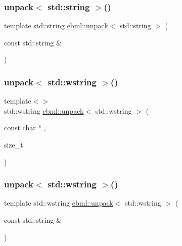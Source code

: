 \mbox{\label{namespaceebml_a59216a04daa34cd404bdd97600ab1fe1}} 
\subsubsection{\texorpdfstring{unpack$<$ std\+::string $>$()}{unpack< std::string >()}\hspace{0.1cm}{\footnotesize\ttfamily [2/2]}}
{\footnotesize\ttfamily template std\+::string \mbox{\hyperlink{namespaceebml_a55a0f9d0c93e80d488021fd03c4f3861}{ebml\+::unpack}}$<$ std\+::string $>$ (\begin{DoxyParamCaption}\item[{const std\+::string \&}]{ }\end{DoxyParamCaption})}

\mbox{\label{namespaceebml_afe61c84674c5ceeaf4d19fa2f994e37b}} 
\subsubsection{\texorpdfstring{unpack$<$ std\+::wstring $>$()}{unpack< std::wstring >()}\hspace{0.1cm}{\footnotesize\ttfamily [1/2]}}
{\footnotesize\ttfamily template$<$$>$ \\
std\+::wstring \mbox{\hyperlink{namespaceebml_a55a0f9d0c93e80d488021fd03c4f3861}{ebml\+::unpack}}$<$ std\+::wstring $>$ (\begin{DoxyParamCaption}\item[{const char $\ast$}]{,  }\item[{size\+\_\+t}]{ }\end{DoxyParamCaption})}

\mbox{\label{namespaceebml_afaec55e41b1bac6c33abe9b8707d489b}} 
\subsubsection{\texorpdfstring{unpack$<$ std\+::wstring $>$()}{unpack< std::wstring >()}\hspace{0.1cm}{\footnotesize\ttfamily [2/2]}}
{\footnotesize\ttfamily template std\+::wstring \mbox{\hyperlink{namespaceebml_a55a0f9d0c93e80d488021fd03c4f3861}{ebml\+::unpack}}$<$ std\+::wstring $>$ (\begin{DoxyParamCaption}\item[{const std\+::string \&}]{ }\end{DoxyParamCaption})}

